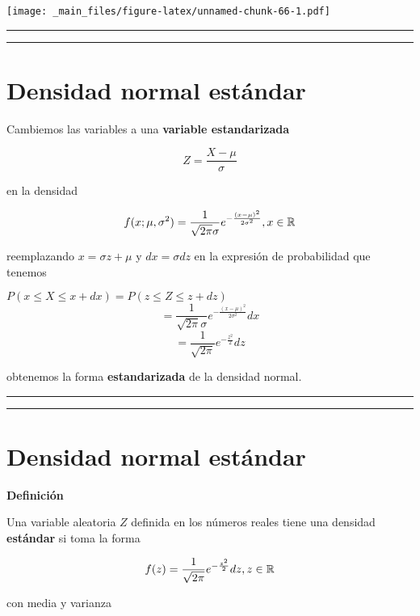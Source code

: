\documentclass[
]{book}
\begin{document}
\texttt{[image: \_main\_files/figure-latex/unnamed-chunk-66-1.pdf]}

\begin{center}\rule{0.5\linewidth}{0.5pt}\end{center}

\begin{center}\rule{0.5\linewidth}{0.5pt}\end{center}

\hypertarget{densidad-normal-estuxe1ndar}{%
\section{Densidad normal estándar}\label{densidad-normal-estuxe1ndar}}

Cambiemos las variables a una \textbf{variable estandarizada}

\[Z=\frac{X-\mu}{\sigma}\]

en la densidad

\[f(x; \mu, \sigma^2)=\frac{1}{\sqrt{2\pi}\sigma}e^{-\frac{(x-\mu)^2}{2\sigma^2}}, x \in {\Bbb R}\]

reemplazando \(x=\sigma z+\mu\) y \(dx=\sigma dz\) en la expresión de probabilidad que tenemos

\(P(x\leq X \leq x +dx)=P(z\leq Z \leq z +dz)\)
\[=\frac{1}{\sqrt{2\pi}\sigma}e^{-\frac{(x-\mu)^2}{2\sigma^2}}dx\] \[=\frac{1}{ \sqrt{2\pi}}e^{-\frac{z^2}{2}} dz\]

obtenemos la forma \textbf{estandarizada} de la densidad normal.

\begin{center}\rule{0.5\linewidth}{0.5pt}\end{center}

\begin{center}\rule{0.5\linewidth}{0.5pt}\end{center}

\hypertarget{densidad-normal-estuxe1ndar-1}{%
\section{Densidad normal estándar}\label{densidad-normal-estuxe1ndar-1}}

\textbf{Definición}

Una variable aleatoria \(Z\) definida en los números reales tiene una densidad \textbf{estándar} si toma la forma

\[f(z)=\frac{1}{\sqrt{2\pi}}e^{-\frac{z^2}{2}} dz,z \in {\Bbb R}\]

con media y varianza
\end{document}
